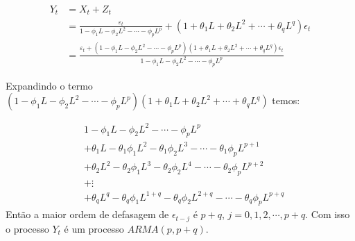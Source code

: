 \begin{enumerate}
		\begin{align*}
			Y_t&=X_t+Z_t\\
			&=\frac{\varepsilon_t}{1-\phi_1L-\phi_2L^2-\cdots-\phi_pL^p}+(1+\theta_1L+\theta_2L^2+\cdots+\theta_qL^q)\epsilon_t\\
			&=\frac{\varepsilon_t+(1-\phi_1L-\phi_2L^2-\cdots-\phi_pL^p)(1+\theta_1L+\theta_2L^2+\cdots+\theta_qL^q)\epsilon_t}{1-\phi_1L-\phi_2L^2-\cdots-\phi_pL^p}
		\end{align*}
	
		Expandindo o termo $(1-\phi_1L-\phi_2L^2-\cdots-\phi_pL^p)(1+\theta_1L+\theta_2L^2+\cdots+\theta_qL^q)$ temos:
		
		\begin{align*}
			&1-\phi_1L-\phi_2L^2-\cdots-\phi_pL^p\\
			&+\theta_1L-\theta_1\phi_1L^2-\theta_1\phi_2L^3-\cdots-\theta_1\phi_pL^{p+1}\\
			&+\theta_2L^2-\theta_2\phi_1L^3-\theta_2\phi_2L^4-\cdots-\theta_2\phi_pL^{p+2}\\
			&+\vdots\\
			&+\theta_qL^q-\theta_q\phi_1L^{1+q}-\theta_q\phi_2L^{2+q}-\cdots-\theta_q\phi_pL^{p+q}
		\end{align*}
	Então a maior ordem de defasagem de $\epsilon_{t-j}$ é $p+q$,  $j=0,1,2,\cdots,p+q$. Com isso o processo $Y_t$ é um processo $ARMA(p,p+q)$.
\end{enumerate}